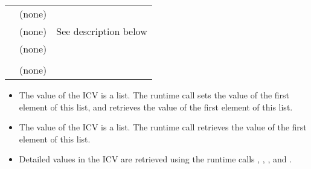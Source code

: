 {\begin{supertabular}{ p{1.2in} p{2.0in} p{1.5in}}
 & (none) & \\

 & (none) & See description below \\

 & (none) & \\

 &  & \\

 & (none) & \\

\end{supertabular}
\linenumbers} %

\descr
\begin{itemize}
\item The value of the  ICV is a list. The runtime call 
 sets the value of the first element of this list, and 
 retrieves the value of the first element of this list.

\item The value of the  ICV is a list. The runtime call  
retrieves the value of the first element of this list. 

\item 
Detailed values in the  ICV are retrieved using the runtime calls  
, , 
, and .
\end{itemize}

